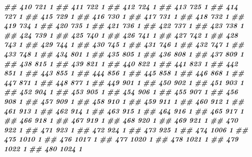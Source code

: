 \documentclass[
]{book}
\newenvironment{Shaded}{\begin{snugshade}}{\end{snugshade}}
\newcommand{\DocumentationTok}[1]{\textcolor[rgb]{0.56,0.35,0.01}{\textbf{\textit{#1}}}}
\theoremstyle{definition}
\theoremstyle{definition}
\theoremstyle{definition}
\theoremstyle{definition}
\theoremstyle{remark}
\begin{document}
\begin{Shaded}
\begin{Highlighting}[]
\DocumentationTok{\#\# 410    721 1}
\DocumentationTok{\#\# 411    722 1}
\DocumentationTok{\#\# 412    724 1}
\DocumentationTok{\#\# 413    725 1}
\DocumentationTok{\#\# 414    727 1}
\DocumentationTok{\#\# 415    729 1}
\DocumentationTok{\#\# 416    730 1}
\DocumentationTok{\#\# 417    731 1}
\DocumentationTok{\#\# 418    732 1}
\DocumentationTok{\#\# 419    734 1}
\DocumentationTok{\#\# 420    735 1}
\DocumentationTok{\#\# 421    736 1}
\DocumentationTok{\#\# 422    737 1}
\DocumentationTok{\#\# 423    738 1}
\DocumentationTok{\#\# 424    739 1}
\DocumentationTok{\#\# 425    740 1}
\DocumentationTok{\#\# 426    741 1}
\DocumentationTok{\#\# 427    742 1}
\DocumentationTok{\#\# 428    743 1}
\DocumentationTok{\#\# 429    744 1}
\DocumentationTok{\#\# 430    745 1}
\DocumentationTok{\#\# 431    746 1}
\DocumentationTok{\#\# 432    747 1}
\DocumentationTok{\#\# 433    748 1}
\DocumentationTok{\#\# 434    801 1}
\DocumentationTok{\#\# 435    805 1}
\DocumentationTok{\#\# 436    808 1}
\DocumentationTok{\#\# 437    809 1}
\DocumentationTok{\#\# 438    815 1}
\DocumentationTok{\#\# 439    821 1}
\DocumentationTok{\#\# 440    822 1}
\DocumentationTok{\#\# 441    823 1}
\DocumentationTok{\#\# 442    851 1}
\DocumentationTok{\#\# 443    855 1}
\DocumentationTok{\#\# 444    856 1}
\DocumentationTok{\#\# 445    858 1}
\DocumentationTok{\#\# 446    868 1}
\DocumentationTok{\#\# 447    871 1}
\DocumentationTok{\#\# 448    877 1}
\DocumentationTok{\#\# 449    901 1}
\DocumentationTok{\#\# 450    902 1}
\DocumentationTok{\#\# 451    903 1}
\DocumentationTok{\#\# 452    904 1}
\DocumentationTok{\#\# 453    905 1}
\DocumentationTok{\#\# 454    906 1}
\DocumentationTok{\#\# 455    907 1}
\DocumentationTok{\#\# 456    908 1}
\DocumentationTok{\#\# 457    909 1}
\DocumentationTok{\#\# 458    910 1}
\DocumentationTok{\#\# 459    911 1}
\DocumentationTok{\#\# 460    912 1}
\DocumentationTok{\#\# 461    913 1}
\DocumentationTok{\#\# 462    914 1}
\DocumentationTok{\#\# 463    915 1}
\DocumentationTok{\#\# 464    916 1}
\DocumentationTok{\#\# 465    917 1}
\DocumentationTok{\#\# 466    918 1}
\DocumentationTok{\#\# 467    919 1}
\DocumentationTok{\#\# 468    920 1}
\DocumentationTok{\#\# 469    921 1}
\DocumentationTok{\#\# 470    922 1}
\DocumentationTok{\#\# 471    923 1}
\DocumentationTok{\#\# 472    924 1}
\DocumentationTok{\#\# 473    925 1}
\DocumentationTok{\#\# 474   1006 1}
\DocumentationTok{\#\# 475   1010 1}
\DocumentationTok{\#\# 476   1017 1}
\DocumentationTok{\#\# 477   1020 1}
\DocumentationTok{\#\# 478   1021 1}
\DocumentationTok{\#\# 479   1022 1}
\DocumentationTok{\#\# 480   1024 1}

\end{Highlighting}
\end{Shaded}
\end{document}
